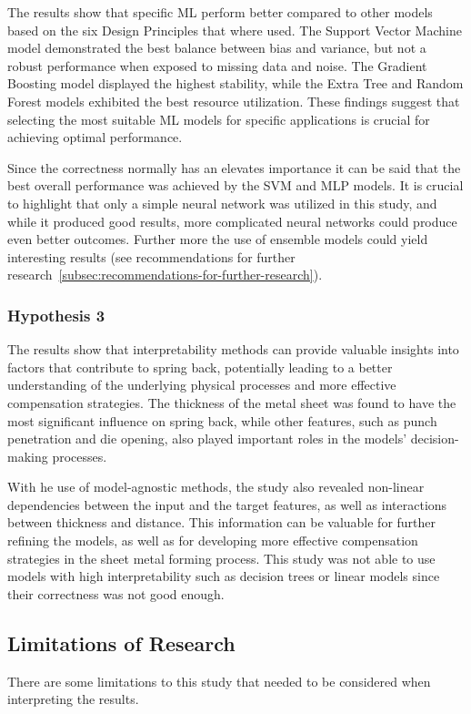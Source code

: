The results show that specific \ac{ML} perform better compared to other models based on the six Design Principles
that where used.
The Support Vector Machine model demonstrated the best balance between bias and variance, but not a robust performance
when exposed to missing data and noise.
The Gradient Boosting model displayed the highest stability, while the Extra Tree and Random Forest models exhibited
the best resource utilization.
These findings suggest that selecting the most suitable ML models for specific applications is crucial for achieving
optimal performance.

Since the correctness normally has an elevates importance it can be said that the best overall performance was achieved
by the \ac{SVM} and \ac{MLP} models.
It is crucial to highlight that only a simple neural network was utilized in this study, and while it produced good
results, more complicated neural networks could produce even better outcomes.
Further more the use of ensemble models could yield interesting results (see recommendations for further
research~\ref{subsec:recommendations-for-further-research}).


\subsubsection{Hypothesis 3}
The results show that interpretability methods can provide valuable insights into factors that contribute to spring
back,
potentially leading to a better understanding of the underlying physical processes and more effective compensation
strategies.
The thickness of the metal sheet was found to have the most significant influence on spring back, while other
features, such as punch penetration and die opening, also played important roles in the models' decision-making
processes.

With he use of model-agnostic methods, the study also revealed non-linear dependencies between the input and the
target features, as well as interactions between thickness and distance.
This information can be valuable for further refining the models, as well as for developing more effective
compensation strategies in the sheet metal forming process.
This study was not able to use models with high interpretability such as decision trees or linear models
since their correctness was not good enough.

\subsection{Limitations of Research}\label{subsec:limitations-of-research}
There are some limitations to this study that needed to be considered when interpreting the results.

